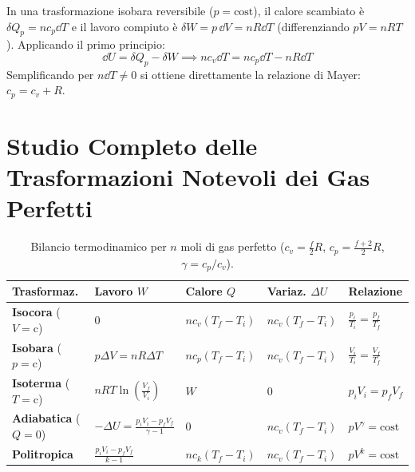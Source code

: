\begin{dimostrazione}
In una trasformazione isobara reversibile ($p = \text{cost}$), il calore scambiato è $\delta Q_p = n c_p \dd T$ e il lavoro compiuto è $\delta W = p\,\dd V = n R \dd T$ (differenziando $p V = n R T$).
Applicando il primo principio:
\begin{equation}
    \dd U = \delta Q_p - \delta W \implies n c_v \dd T = n c_p \dd T - n R \dd T
\end{equation}
Semplificando per $n \dd T \neq 0$ si ottiene direttamente la relazione di Mayer: $c_p = c_v + R$.
\end{dimostrazione}

\section{Studio Completo delle Trasformazioni Notevoli dei Gas Perfetti}
\label{sec:trasformazioni_notevoli}

\begin{table}[htbp]
\centering
\caption{Bilancio termodinamico per $n$ moli di gas perfetto ($c_v = \frac{f}{2}R$, $c_p = \frac{f+2}{2}R$, $\gamma = c_p/c_v$).}
\label{tab:trasformazioni_notevoli}
\begin{tabularx}{\textwidth}{p{2.6cm} p{2.8cm} p{3.2cm} p{3.0cm} X}
\toprule
\textbf{Trasformaz.} & \textbf{Lavoro $W$} & \textbf{Calore $Q$} & \textbf{Variaz. $\Delta U$} & \textbf{Relazione} \\
\midrule
\textbf{Isocora} ($V=\text{c}$) & $0$ & $n c_v (T_f - T_i)$ & $n c_v (T_f - T_i)$ & $\frac{p_i}{T_i} = \frac{p_f}{T_f}$ \\
\textbf{Isobara} ($p=\text{c}$) & $p\Delta V = n R\Delta T$ & $n c_p (T_f - T_i)$ & $n c_v (T_f - T_i)$ & $\frac{V_i}{T_i} = \frac{V_f}{T_f}$ \\
\textbf{Isoterma} ($T=\text{c}$) & $n R T \ln\left(\frac{V_f}{V_i}\right)$ & $W$ & $0$ & $p_i V_i = p_f V_f$ \\
\textbf{Adiabatica} ($Q=0$) & $-\Delta U = \frac{p_i V_i - p_f V_f}{\gamma - 1}$ & $0$ & $n c_v (T_f - T_i)$ & $p V^\gamma = \text{cost}$ \\
\textbf{Politropica} & $\frac{p_i V_i - p_f V_f}{k - 1}$ & $n c_k (T_f - T_i)$ & $n c_v (T_f - T_i)$ & $p V^k = \text{cost}$ \\
\bottomrule
\end{tabularx}
\end{table}

